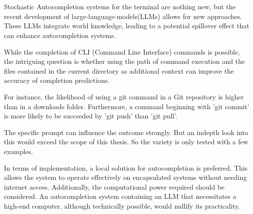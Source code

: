 \section*{}





Stochastic Autocompletion systems for the terminal are nothing new, but the recent development of large-language-models(LLMs) allows for new approaches. These LLMs integrate world knowledge, leading to a potential spillover effect that can enhance autocompletion systems.


While the completion of CLI (Command Line Interface) commands is possible, the intriguing question is whether using the path of command execution and the files contained in the current directory as additional context can improve the accuracy of completion predictions.

For instance, the likelihood of using a git command in a Git repository is higher than in a downloads folder. Furthermore, a command beginning with 'git commit' is more likely to be succeeded by 'git push' than 'git pull'.

The specific prompt can influence the outcome strongly. But an indepth look into this would exceed the scope of this thesis. So  the variety is only tested with a few examples.

In terms of implementation, a local solution for autocompletion is preferred. This allows the system to operate effectively on encapsulated systems without needing internet access. Additionally, the computational power required should be considered. An autocompletion system containing an LLM that necessitates a high-end computer, although technically possible, would nullify its practicality.



